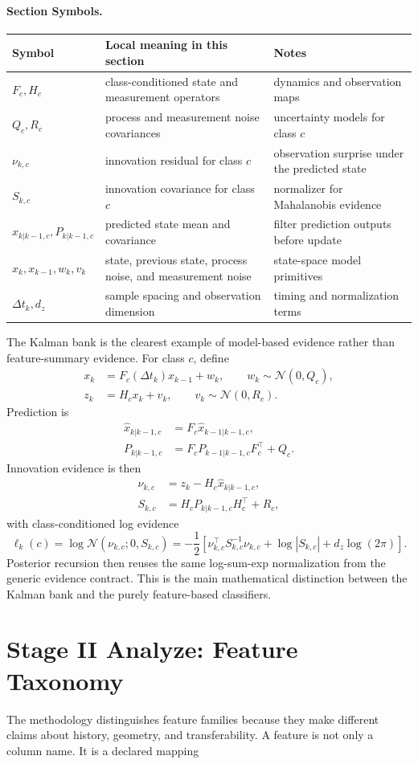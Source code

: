 \documentclass[11pt]{article}
\newcommand{\sectionsymbol}[3]{#1 & #2 & #3 \\}
\newcommand{\sectionsymbols}[1]{%
\begin{center}
\small
\setlength{\tabcolsep}{4pt}
\begin{tabularx}{0.95\textwidth}{>{\raggedright\arraybackslash}p{0.16\textwidth}X>{\raggedright\arraybackslash}p{0.18\textwidth}}
\toprule
Symbol & Local meaning in this section & Notes \\
\midrule
#1
\bottomrule
\end{tabularx}
\end{center}
}
\begin{document}
\paragraph{Section Symbols.}
\sectionsymbols{
\sectionsymbol{\(F_c, H_c\)}{class-conditioned state and measurement operators}{dynamics and observation maps}
\sectionsymbol{\(Q_c, R_c\)}{process and measurement noise covariances}{uncertainty models for class \(c\)}
\sectionsymbol{\(\nu_{k,c}\)}{innovation residual for class \(c\)}{observation surprise under the predicted state}
\sectionsymbol{\(S_{k,c}\)}{innovation covariance for class \(c\)}{normalizer for Mahalanobis evidence}
\sectionsymbol{\(\hat{x}_{k|k-1,c}, P_{k|k-1,c}\)}{predicted state mean and covariance}{filter prediction outputs before update}
\sectionsymbol{\(x_k, x_{k-1}, w_k, v_k\)}{state, previous state, process noise, and measurement noise}{state-space model primitives}
\sectionsymbol{\(\Delta t_k, d_z\)}{sample spacing and observation dimension}{timing and normalization terms}
}

\noindent
The Kalman bank is the clearest example of model-based evidence rather than feature-summary evidence. For class \(c\), define
\begin{align}
x_k &= F_c(\Delta t_k)x_{k-1} + w_k, \qquad w_k \sim \mathcal{N}(0, Q_c), \\
z_k &= H_c x_k + v_k, \qquad v_k \sim \mathcal{N}(0, R_c).
\end{align}
Prediction is
\begin{align}
\hat{x}_{k|k-1,c} &= F_c \hat{x}_{k-1|k-1,c}, \\
P_{k|k-1,c} &= F_c P_{k-1|k-1,c} F_c^\top + Q_c.
\end{align}
Innovation evidence is then
\begin{align}
\nu_{k,c} &= z_k - H_c \hat{x}_{k|k-1,c}, \\
S_{k,c} &= H_c P_{k|k-1,c} H_c^\top + R_c,
\end{align}
with class-conditioned log evidence
\begin{equation}
\ell_k(c)
=
\log \mathcal{N}(\nu_{k,c}; 0, S_{k,c})
=
-\frac{1}{2}
\left[
\nu_{k,c}^\top S_{k,c}^{-1} \nu_{k,c}
+
\log |S_{k,c}|
+
d_z \log(2\pi)
\right].
\end{equation}
Posterior recursion then reuses the same log-sum-exp normalization from the generic evidence contract. This is the main mathematical distinction between the Kalman bank and the purely feature-based classifiers.

\section{Stage II Analyze: Feature Taxonomy}
The methodology distinguishes feature families because they make different
claims about history, geometry, and transferability. A feature is not only a
column name. It is a declared mapping
\end{document}
